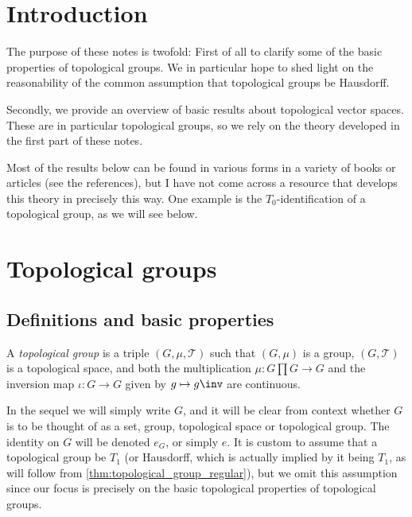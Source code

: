 \documentclass[article, a4paper, 11pt, oneside]{memoir}
\title{\doctitle}
\author{\docauthor}
\numberwithin{equation}{chapter}
\newcommand{\calT}{\mathcal{T}}
\begin{document}
\maketitle

\chapter{Introduction}

The purpose of these notes is twofold: First of all to clarify some of the basic properties of topological groups. We in particular hope to shed light on the reasonability of the common assumption that topological groups be Hausdorff.

Secondly, we provide an overview of basic results about topological vector spaces. These are in particular topological groups, so we rely on the theory developed in the first part of these notes.

Most of the results below can be found in various forms in a variety of books or articles (see the references), but I have not come across a resource that develops this theory in precisely this way. One example is the $T_0$-identification of a topological group, as we will see below.


\chapter{Topological groups}

\section{Definitions and basic properties}

\begin{definition}
    \label{def:topological_group}
    A \emph{topological group} is a triple $(G, \mu, \calT)$ such that $(G, \mu)$ is a group, $(G, \calT)$ is a topological space, and both the multiplication $\mu \colon G \prod G \to G$ and the inversion map $\iota \colon G \to G$ given by $g \mapsto g\inv$ are continuous.
\end{definition}
%
In the sequel we will simply write $G$, and it will be clear from context whether $G$ is to be thought of as a set, group, topological space or topological group. The identity on $G$ will be denoted $e_G$, or simply $e$. It is custom to assume that a topological group be $T_1$ (or Hausdorff, which is actually implied by it being $T_1$, as will follow from \cref{thm:topological_group_regular}), but we omit this assumption since our focus is precisely on the basic topological properties of topological groups.
\end{document}
